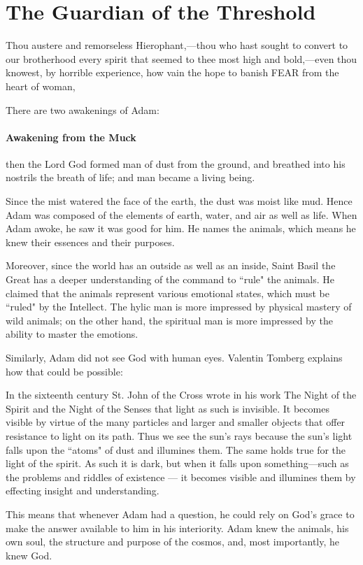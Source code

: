 \section{The Guardian of the Threshold}

\begin{quotex}
Thou austere and remorseless Hierophant,—thou who hast sought to convert to our brotherhood every spirit that seemed to thee most high and bold,—even thou knowest, by horrible experience, how vain the hope to banish FEAR from the heart of woman, 

\end{quotex}
There are two awakenings of Adam:

\paragraph{Awakening from the Muck}
\begin{quotex}
then the Lord God formed man of dust from the ground, and breathed into his nostrils the breath of life; and man became a living being. 

\end{quotex}

Since the mist watered the face of the earth, the dust was moist like mud. Hence Adam was composed of the elements of earth, water, and air as well as life. When Adam awoke, he saw it was good for him. He names the animals, which means he knew their essences and their purposes.

Moreover, since the world has an outside as well as an inside, Saint Basil the Great has a deeper understanding of the command to ``rule" the animals. He claimed that the animals represent various emotional states, which must be ``ruled" by the Intellect. The hylic man is more impressed by physical mastery of wild animals; on the other hand, the spiritual man is more impressed by the ability to master the emotions.

Similarly, Adam did not see God with human eyes. Valentin Tomberg explains how that could be possible:

\begin{quotex}
In the sixteenth century St. John of the Cross wrote in his work The Night of the Spirit and the Night of the Senses that light as such is invisible. It becomes visible by virtue of the many particles and larger and smaller objects that offer resistance to light on its path. Thus we see the sun's rays because the sun's light falls upon the ``atoms" of dust and illumines them. The same holds true for the light of the spirit. As such it is dark, but when it falls upon something—such as the problems and riddles of existence — it becomes visible and illumines them by effecting insight and understanding. 

\end{quotex}
This means that whenever Adam had a question, he could rely on God's grace to make the answer available to him in his interiority. Adam knew the animals, his own soul, the structure and purpose of the cosmos, and, most importantly, he knew God.

